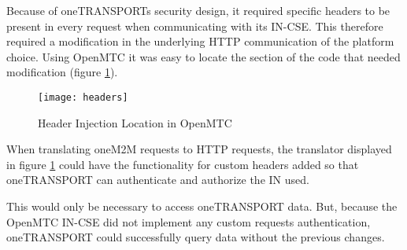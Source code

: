 Because of oneTRANSPORTs security design, it required specific headers to be present in every request when communicating with its IN-CSE. This therefore required a modification in the underlying HTTP communication of the platform choice. Using OpenMTC it was easy to locate the section of the code that needed modification (figure \ref{headers}).

\begin{figure}[H]
  \centering
  \texttt{[image: headers]}
  \caption{Header Injection Location in OpenMTC}
  \label{headers}
\end{figure}

When translating oneM2M requests to HTTP requests, the translator displayed in figure \ref{headers} could have the functionality for custom headers added so that oneTRANSPORT can authenticate and authorize  the IN used. 

This would only be necessary to access oneTRANSPORT data. But, because the OpenMTC IN-CSE did not implement any custom requests authentication, oneTRANSPORT could successfully query data without the previous changes.

\clearpage
